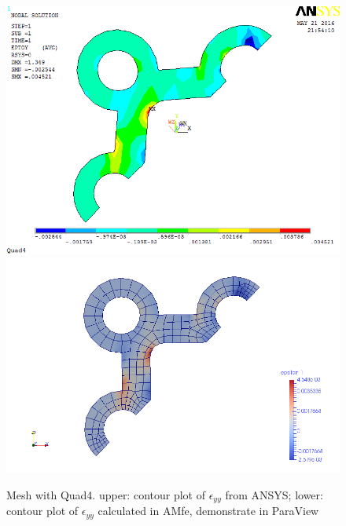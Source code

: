 \begin{figure}[htbp]
	\begin{center}
		\includegraphics[width=13cm,clip]{Quad4_Eyy.png} 		
		\includegraphics[width=13cm,clip]{Quad4_Eyy_P.png} 		
		\caption{Mesh with Quad4. upper: contour plot of $\epsilon_{yy}$ from ANSYS; lower: contour plot of $\epsilon_{yy}$ calculated in AMfe, demonstrate in ParaView} \label{fig: Quad4_Eyy}
	\end{center}
\end{figure}
\clearpage 

